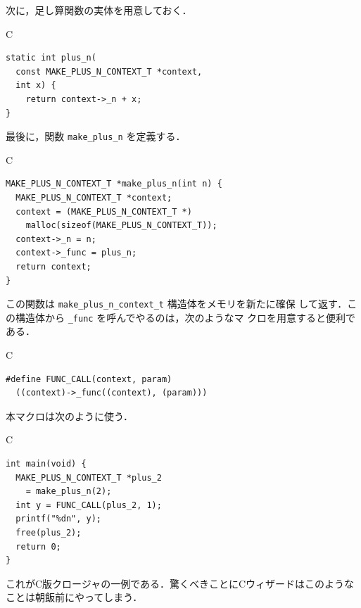 \documentclass[a5paper,twoside,fleqn,draft]{jsbook}
\newcommand{\programminglanguage}[1]{\textsf{#1}}
\newcommand{\clang}{\programminglanguage{C}}
\newcommand{\code}[1]{\texttt{#1}}
\newenvironment{ccode}{\begin{itembox}[r]{\clang}}{\end{itembox}}
\begin{document}
次に，足し算関数の実体を用意しておく．
\begin{ccode}
\begin{verbatim}
static int plus_n(
  const MAKE_PLUS_N_CONTEXT_T *context,
  int x) {
    return context->_n + x;
}
\end{verbatim}
\end{ccode}

最後に，関数 \code{make\_plus\_n} を定義する．
\begin{ccode}
\begin{verbatim}
MAKE_PLUS_N_CONTEXT_T *make_plus_n(int n) {
  MAKE_PLUS_N_CONTEXT_T *context;
  context = (MAKE_PLUS_N_CONTEXT_T *)
    malloc(sizeof(MAKE_PLUS_N_CONTEXT_T));
  context->_n = n;
  context->_func = plus_n;
  return context;
}
\end{verbatim}
\end{ccode}
この関数は \code{make\_plus\_n\_context\_t} 構造体をメモリを新たに確保
して返す．この構造体から \code{\_func} を呼んでやるのは，次のようなマ
クロを用意すると便利である．
\begin{ccode}
\begin{verbatim}
#define FUNC_CALL(context, param)
  ((context)->_func((context), (param)))
\end{verbatim}
\end{ccode}
本マクロは次のように使う．
\begin{ccode}
\begin{verbatim}
int main(void) {
  MAKE_PLUS_N_CONTEXT_T *plus_2
    = make_plus_n(2);
  int y = FUNC_CALL(plus_2, 1);
  printf("%dn", y);
  free(plus_2);
  return 0;
}
\end{verbatim}
\end{ccode}
これが\clang 版クロージャの一例である．驚くべきことに\clang ウィザードはこのようなことは朝飯前にやってしまう．

\end{document}
